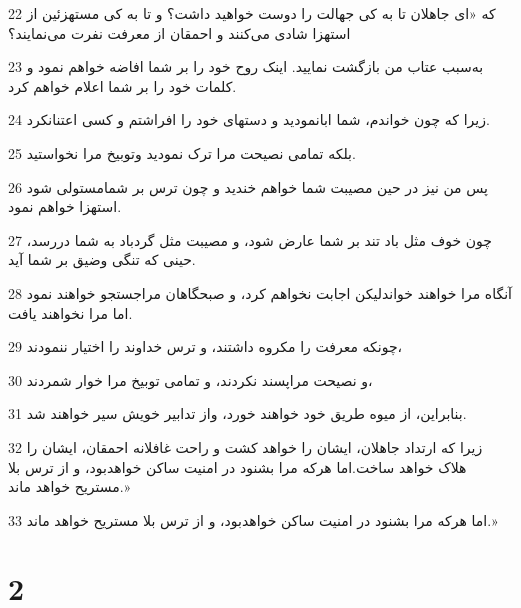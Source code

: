 \par 22 که «ای جاهلان تا به کی جهالت را دوست خواهید داشت؟ و تا به کی مستهزئین از استهزا شادی می‌کنند و احمقان از معرفت نفرت می‌نمایند؟
\par 23 به‌سبب عتاب من بازگشت نمایید. اینک روح خود را بر شما افاضه خواهم نمود و کلمات خود را بر شما اعلام خواهم کرد.
\par 24 زیرا که چون خواندم، شما ابانمودید و دستهای خود را افراشتم و کسی اعتنانکرد.
\par 25 بلکه تمامی نصیحت مرا ترک نمودید وتوبیخ مرا نخواستید.
\par 26 پس من نیز در حین مصیبت شما خواهم خندید و چون ترس بر شمامستولی شود استهزا خواهم نمود.
\par 27 چون خوف مثل باد تند بر شما عارض شود، و مصیبت مثل گردباد به شما دررسد، حینی که تنگی وضیق بر شما آید.
\par 28 آنگاه مرا خواهند خواندلیکن اجابت نخواهم کرد، و صبحگاهان مراجستجو خواهند نمود اما مرا نخواهند یافت.
\par 29 چونکه معرفت را مکروه داشتند، و ترس خداوند را اختیار ننمودند،
\par 30 و نصیحت مراپسند نکردند، و تمامی توبیخ مرا خوار شمردند،
\par 31 بنابراین، از میوه طریق خود خواهند خورد، واز تدابیر خویش سیر خواهند شد.
\par 32 زیرا که ارتداد جاهلان، ایشان را خواهد کشت و راحت غافلانه احمقان، ایشان را هلاک خواهد ساخت.اما هر‌که مرا بشنود در امنیت ساکن خواهدبود، و از ترس بلا مستریح خواهد ماند.»
\par 33 اما هر‌که مرا بشنود در امنیت ساکن خواهدبود، و از ترس بلا مستریح خواهد ماند.»
 
\chapter{2}

